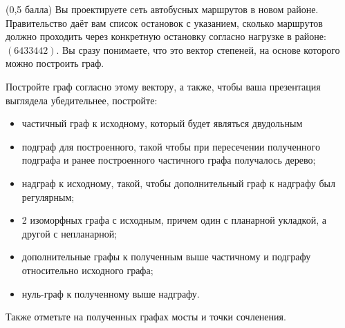 \question
(0,5 балла) Вы проектируете сеть автобусных маршрутов в новом районе. Правительство даёт вам список остановок с указанием, сколько маршрутов должно проходить через конкретную остановку согласно нагрузке в районе: $(6 4 3 3 4 4 2)$. Вы сразу понимаете, что это вектор степеней, на основе которого можно построить граф.

Постройте граф согласно этому вектору, а также, чтобы ваша презентация выглядела убедительнее, постройте:

\begin{itemize}
\item частичный граф к исходному, который будет являться двудольным
\item подграф для построенного, такой чтобы при пересечении полученного подграфа и ранее построенного частичного графа получалось дерево;
\item надграф к исходному, такой, чтобы дополнительный граф к надграфу был регулярным;
\item 2 изоморфных графа с исходным, причем один с планарной укладкой, а другой с непланарной;
\item дополнительные графы к полученным выше частичному и подграфу относительно исходного графа;
\item нуль-граф к полученному выше надграфу.
\end{itemize}

Также отметьте на полученных графах мосты и точки сочленения.
